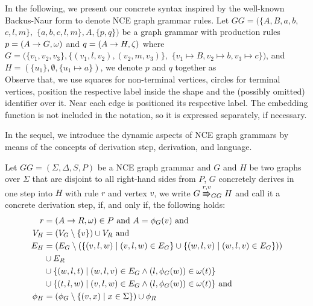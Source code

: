 \documentclass[runningheads]{llncs}
\begin{document}

In the following, we present our concrete syntax inspired by the well-known Backus-Naur form to denote NCE graph grammar rules. Let $GG = (\{A, B, a, b,$ $ c, l, m\},$ $\{a, b, c, l, m\}, A, \{p,q\})$ be a graph grammar with production rules $p = (A \to G,\omega)$ and $q = (A \to H,\zeta)$ where $G = (\{v_1, v_2, v_3\}, \{(v_1,l,v_2), (v_2,m,v_3)\},$ $\{v_1 \mapsto B, v_2 \mapsto b, v_3 \mapsto c \})$, and $H = (\{u_1\}, \emptyset, \{u_1 \mapsto a\})$, we denote $p$ and $q$ together as\\


Observe that, we use squares for non-terminal vertices, circles for terminal vertices, position the respective label inside the shape and the (possibly omitted) identifier over it. Near each edge is positioned its respective label. The embedding function is not included in the notation, so it is expressed separately, if necessary.

In the sequel, we introduce the dynamic aspects of NCE graph grammars by means of the concepts of derivation step, derivation, and language.

\begin{definition}
	\label{def:gg_dstep}
	Let $GG = (\Sigma, \Delta, S, P)$ be a NCE graph grammar and $G$ and $H$ be two graphs over $\Sigma$ that are disjoint to all right-hand sides from $P$, $G$ concretely derives in one step into $H$ with rule $r$ and vertex $v$, we write $G \cderiv{r}{v}{GG} H$ and call it a concrete derivation step, if, and only if, the following holds:
	\begin{align*}
		r & = (A \to R, \omega) \in P \text{ and } A = \phi_G(v) \text{ and} \\
		V_H  & = (V_G \setminus \{v\}) \cup V_R \text{ and} \\
		E_H & = (E_G \setminus (\{(v,l,w) \; | \; (v,l,w) \in E_G\} \cup \{(w,l,v) \; | \; (w,l,v) \in E_G\})) \\
		& \cup E_R \\
		& \cup \{(w,l,t) \; | \; (w,l,v) \in E_G \land (l,\phi_G(w)) \in \omega(t)\} \\
		& \cup \{(t,l,w) \; | \; (v,l,w) \in E_G \land (l,\phi_G(w)) \in \omega(t)\} \text{ and} \\
		\phi_H & = (\phi_G \setminus \{(v,x) \; | \; x \in \Sigma \}) \cup \phi_R
	\end{align*}
\end{definition}
\end{document}
